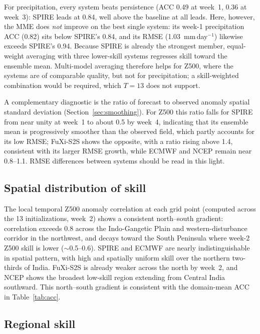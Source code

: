 \documentclass[11pt]{article}
\begin{document}
For precipitation, every system beats persistence (ACC 0.49 at week~1,
0.36 at week~3): SPIRE leads at 0.84, well above the baseline at all
leads. Here, however, the MME does \emph{not} improve on the best single
system: its week-1 precipitation ACC (0.82) sits below SPIRE's 0.84,
and its RMSE (1.03~mm\,day$^{-1}$) likewise exceeds SPIRE's 0.94.
Because SPIRE is already the strongest member, equal-weight averaging
with three lower-skill systems regresses skill toward the ensemble mean.
Multi-model averaging therefore helps for Z500, where the systems are of
comparable quality, but not for precipitation; a skill-weighted
combination would be required, which $T=13$ does not support.

A complementary diagnostic is the ratio of forecast to observed
anomaly spatial standard deviation (Section~\ref{sec:smoothing}). For
Z500 this ratio falls for SPIRE from near unity at week~1 to about 0.5
by week~4, indicating that its ensemble mean is progressively smoother
than the observed field, which partly accounts for its low RMSE; FuXi-S2S
shows the opposite, with a ratio rising above 1.4, consistent with its
larger RMSE growth, while ECMWF and NCEP remain near 0.8--1.1. RMSE
differences between systems should be read in this light.

\subsection{Spatial distribution of skill}\label{sec:spatial_skill}

The local temporal Z500 anomaly correlation at each grid point (computed
across the 13 initializations, week~2) shows a consistent north--south
gradient: correlation exceeds 0.8 across the Indo-Gangetic Plain and
western-disturbance corridor in the northwest, and decays toward the
South Peninsula where week-2 Z500 skill is lower ($\sim$0.5--0.6).
SPIRE and ECMWF are nearly indistinguishable in spatial pattern, with
high and spatially uniform skill over the northern two-thirds of India.
FuXi-S2S is already weaker across the north by week~2, and NCEP shows
the broadest low-skill region extending from Central India southward.
This north--south gradient is consistent with the domain-mean ACC in
Table~\ref{tab:acc}.

\subsection{Regional skill}\label{sec:regional_skill}
\end{document}
